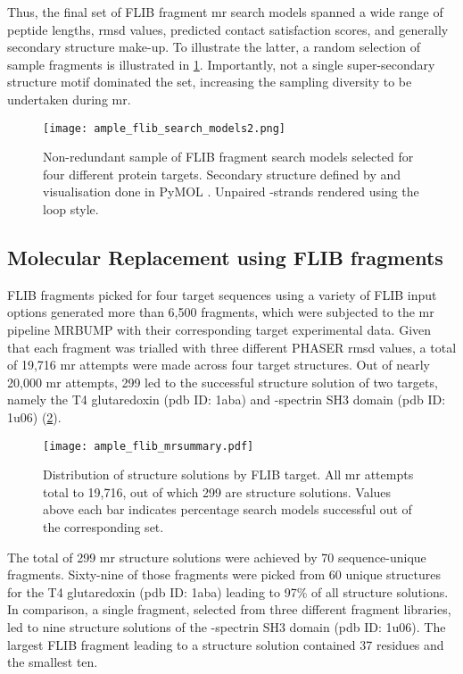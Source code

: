 Thus, the final set of FLIB fragment \gls{mr} search models spanned a wide range of peptide lengths, \gls{rmsd} values, predicted contact satisfaction scores, and generally secondary structure make-up. To illustrate the latter, a random selection of sample fragments is illustrated in \cref{fig:ample_flib_search_models}. Importantly, not a single super-secondary structure motif dominated the set, increasing the sampling diversity to be undertaken during \gls{mr}.

\begin{figure}[H]
	\centering
	\texttt{[image: ample\_flib\_search\_models2.png]}
	\caption[Fragment search models derived from FLIB]{Non-redundant sample of FLIB fragment search models selected for four different protein targets. Secondary structure defined by and visualisation done in PyMOL \cite{Delano2002-hm}. Unpaired \textbeta-strands rendered using the loop style.}
	\label{fig:ample_flib_search_models}
\end{figure}

\subsection{Molecular Replacement using FLIB fragments}
FLIB fragments picked for four target sequences using a variety of FLIB input options generated more than 6,500 fragments, which were subjected to the \gls{mr} pipeline MRBUMP with their corresponding target experimental data. Given that each fragment was trialled with three different PHASER \gls{rmsd} values, a total of 19,716 \gls{mr} attempts were made across four target structures. Out of nearly 20,000 \gls{mr} attempts, 299 led to the successful structure solution of two targets, namely the T4 glutaredoxin (\gls{pdb} ID: 1aba) and \textalpha-spectrin SH3 domain (\gls{pdb} ID: 1u06) (\cref{fig:ample_flib_mrsummary}).

\begin{figure}[H]
	\centering
	\texttt{[image: ample\_flib\_mrsummary.pdf]}
	\caption[MR structure solutions by FLIB target]{Distribution of structure solutions by FLIB target. All \gls{mr} attempts total to 19,716, out of which 299 are structure solutions. Values above each bar indicates percentage search models successful out of the corresponding set.}
	\label{fig:ample_flib_mrsummary}
\end{figure}

The total of 299 \gls{mr} structure solutions were achieved by 70 sequence-unique fragments. Sixty-nine of those fragments were picked from 60 unique structures for the T4 glutaredoxin (\gls{pdb} ID: 1aba) leading to 97\% of all structure solutions. In comparison, a single fragment, selected from three different fragment libraries, led to nine structure solutions of the \textalpha-spectrin SH3 domain (\gls{pdb} ID: 1u06). The largest FLIB fragment leading to a structure solution contained 37 residues and the smallest ten.

